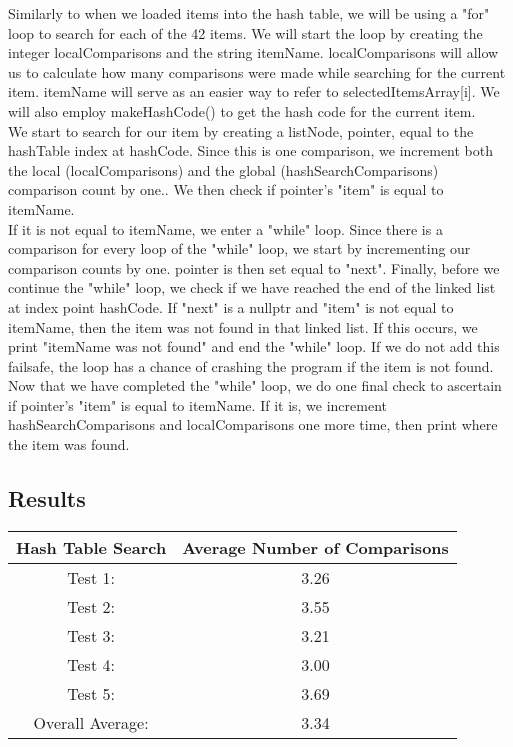 \documentclass{article}
\begin{document}
Similarly to when we loaded items into the hash table, we will be using a "for" loop to search for each of the 42 items. We will start the loop by creating the integer localComparisons and the string itemName. localComparisons will allow us to calculate how many comparisons were made while searching for the current item. itemName will serve as an easier way to refer to selectedItemsArray[i]. We will also employ makeHashCode() to get the hash code for the current item. \\
We start to search for our item by creating a listNode, pointer, equal to the hashTable index at hashCode. Since this is one comparison, we increment both the local (localComparisons) and the global (hashSearchComparisons) comparison count by one.. We then check if pointer's "item" is equal to itemName. \\
If it is not equal to itemName, we enter a "while" loop. Since there is a comparison for every loop of the "while" loop, we start by incrementing our comparison counts by one. pointer is then set equal to "next". Finally, before we continue the "while" loop, we check if we have reached the end of the linked list at index point hashCode. If "next" is a nullptr and "item" is not equal to itemName, then the item was not found in that linked list. If this occurs, we print "{itemName} was not found" and end the "while" loop. If we do not add this failsafe, the loop has a chance of crashing the program if the item is not found. \\
Now that we have completed the "while" loop, we do one final check to ascertain if pointer's "item" is equal to itemName. If it is, we increment hashSearchComparisons and localComparisons one more time, then print where the item was found. \\


\subsection{Results}
\begin{center}
\begin{tabular}{||c | c ||} 
 \hline
 Hash Table Search & Average Number of Comparisons\\ [0.5ex] 
 \hline\hline
 Test 1: & 3.26\\ 
 \hline
 Test 2: & 3.55\\
 \hline
 Test 3: & 3.21\\
 \hline
 Test 4: & 3.00\\
 \hline
 Test 5: & 3.69\\
 \hline
 Overall Average: & 3.34\\ [1ex] 
 \hline
\end{tabular}
\\
\end{center}
\end{document}

